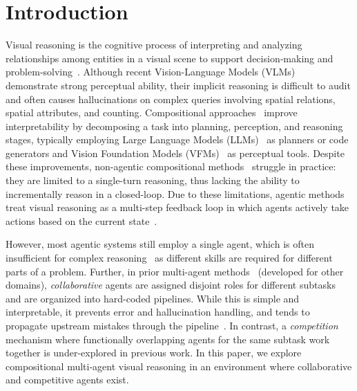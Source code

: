 \documentclass{article} %
\begin{document}
\clearpage

\section{Introduction}

Visual reasoning is the cognitive process of interpreting and analyzing relationships among entities in a visual scene to support decision‑making and problem‑solving~\citep{ke_explain_2025}. Although recent Vision-Language Models (VLMs)~\citep{liu_visual_2023, chen_internvl_2024, bai_qwen25-vl_2025} demonstrate strong perceptual ability, their implicit reasoning is difficult to audit and often causes hallucinations on complex queries involving spatial relations, spatial attributes, and counting. Compositional approaches~\citep{suris_vipergpt_2023, you_idealgpt_2023, ke_hydra_2024, cai_naver_2025} improve interpretability by decomposing a task into planning, perception, and reasoning stages, typically employing Large Language Models (LLMs)~\citep{gemini-team_gemini_2023, openai_gpt-4o_2024, deepseek-ai_deepseek-r1_2025} as planners or code generators and Vision Foundation Models (VFMs)~\citep{radford_learning_2021, liu_grounding_2023, xiao_florence-2_2024, yang_depth_2024} as perceptual tools. Despite these improvements, non-agentic compositional methods~\citep{suris_vipergpt_2023, lu_chameleon_2023} struggle in practice: they are limited to a single-turn reasoning, thus lacking the ability to incrementally reason in a closed-loop. Due to these limitations, agentic methods~\citep{you_idealgpt_2023, ke_hydra_2024, gao_clova_2024, zhong_viotgpt_2025} treat visual reasoning as a multi-step feedback loop in which agents actively take actions based on the current state~\citep{ke_explain_2025}.

However, most agentic systems still employ a single agent, which is often insufficient for complex reasoning~\citep{wang_towards_2025} as different skills are required for different parts of a problem. 
Further, in prior multi-agent methods~\citep{hong_metagpt_2023, li_agent-oriented_2024, nguyen_ma-rag_2025, zhang_agentorchestra_2025} (developed for other domains), \emph{collaborative} agents are assigned disjoint roles for different subtasks and are organized into hard-coded pipelines. While this is simple and interpretable, it prevents error and hallucination handling, and tends to propagate upstream mistakes through the pipeline~\citep{gao_clova_2024, ke_dwim_2025}. In contrast, a \emph{competition} mechanism where functionally overlapping agents for the same subtask work together is under-explored in previous work.
In this paper, we explore compositional multi‑agent visual reasoning in an environment where collaborative and competitive agents exist.
\end{document}
